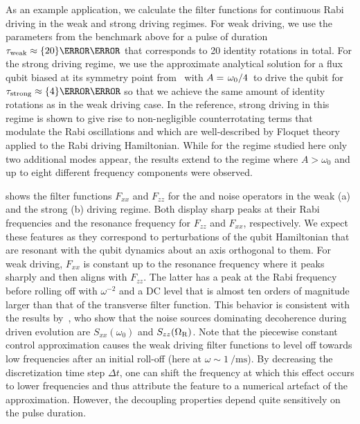 As an example application, we calculate the filter functions for continuous Rabi driving in the weak and strong driving regimes.
For weak driving, we use the parameters from the benchmark above for a pulse of duration $\tau_\mr{weak}\approx\qty{20}{\micro\second}$ that corresponds to \num{20} identity rotations in total.
For the strong driving regime, we use the approximate analytical solution for a flux qubit biased at its symmetry point from~ with $A = \flatfrac{\omega_0}{4}$ to drive the qubit for $\tau_\mr{strong}\approx\qty{4}{\nano\second}$ so that we achieve the same amount of identity rotations as in the weak driving case.
In the reference, strong driving in this regime is shown to give rise to non-negligible counterrotating terms that modulate the Rabi oscillations and which are well-described by Floquet theory applied to the Rabi driving Hamiltonian.
While for the regime studied here only two additional modes appear, the results extend to the regime where $A > \omega_0$ and up to eight different frequency components were observed.

 shows the filter functions $F_{xx}$ and $F_{zz}$ for the \px and \pz noise operators in the weak (a) and the strong (b) driving regime.
Both display sharp peaks at their Rabi frequencies and the resonance frequency for $F_{zz}$ and $F_{xx}$, respectively.
We expect these features as they correspond to perturbations of the qubit Hamiltonian that are resonant with the qubit dynamics about an axis orthogonal to them.
For weak driving, $F_{xx}$ is constant up to the resonance frequency where it peaks sharply and then aligns with $F_{zz}$.
The latter has a peak at the Rabi frequency before rolling off with $\omega^{-2}$ and a DC level that is almost ten orders of magnitude larger than that of the transverse filter function.
This behavior is consistent with the results by~\citeauthor{Yan2013}, who show that the noise sources dominating decoherence during driven evolution are $S_{xx}(\omega_0)$ and $S_{zz}(\Omega_{\mathrm{R}})$.
Note that the piecewise constant control approximation causes the weak driving filter functions to level off towards low frequencies after an initial roll-off (here at $\omega\sim\qty{1}{\per\milli\second}$).
By decreasing the discretization time step $\Delta t$, one can shift the frequency at which this effect occurs to lower frequencies and thus attribute the feature to a numerical artefact of the approximation.
However, the decoupling properties depend quite sensitively on the pulse duration.

